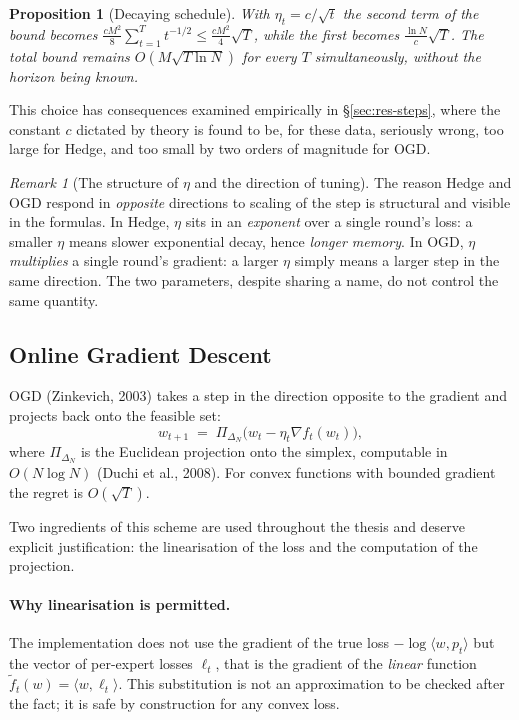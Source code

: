 \documentclass[12pt,a4paper,oneside]{report}
\renewcommand{\_}{\oldunderscore\allowbreak}
\theoremstyle{definition}
\theoremstyle{plain}
\newtheorem{proposition}[theorem]{Proposition}
\theoremstyle{remark}
\newtheorem{remark}[theorem]{Remark}
\begin{document}
\begin{proposition}[Decaying schedule]
\label{prop:anytime}
With $\eta_t = c/\sqrt{t}$ the second term of the bound becomes
$\frac{c M^2}{8}\sum_{t=1}^{T} t^{-1/2} \leq \frac{c M^2}{4}\sqrt{T}$, while the first becomes
$\frac{\ln N}{c}\sqrt{T}$. The total bound remains $O(M\sqrt{T\ln N})$ for every $T$
simultaneously, without the horizon being known.
\end{proposition}

This choice has consequences examined empirically in \S\ref{sec:res-steps}, where the constant
$c$ dictated by theory is found to be, for these data, seriously wrong, too large for Hedge,
and too small by two orders of magnitude for OGD.

\begin{remark}[The structure of $\eta$ and the direction of tuning]
The reason Hedge and OGD respond in \emph{opposite} directions to scaling of the step is
structural and visible in the formulas. In Hedge, $\eta$ sits in an \emph{exponent} over a
single round's loss: a smaller $\eta$ means slower exponential decay, hence \emph{longer
memory}. In OGD, $\eta$ \emph{multiplies} a single round's gradient: a larger $\eta$ simply
means a larger step in the same direction. The two parameters, despite sharing a name, do not
control the same quantity.
\end{remark}

\subsection{Online Gradient Descent}

OGD (Zinkevich, 2003) takes a step in the direction opposite to the gradient and projects back
onto the feasible set:
\[
w_{t+1} \;=\; \Pi_{\Delta_N}\!\big(w_t - \eta_t \nabla f_t(w_t)\big),
\]
where $\Pi_{\Delta_N}$ is the Euclidean projection onto the simplex, computable in
$O(N \log N)$ (Duchi et al., 2008). For convex functions with bounded gradient the regret is
$O(\sqrt{T})$.

Two ingredients of this scheme are used throughout the thesis and deserve explicit
justification: the linearisation of the loss and the computation of the projection.

\paragraph{Why linearisation is permitted.} The implementation does not use the gradient of
the true loss $-\log\langle w, p_t\rangle$ but the vector of per-expert losses $\ell_t$, that
is the gradient of the \emph{linear} function $\tilde{f}_t(w) = \langle w, \ell_t\rangle$. This
substitution is not an approximation to be checked after the fact; it is safe by construction
for any convex loss.
\end{document}

